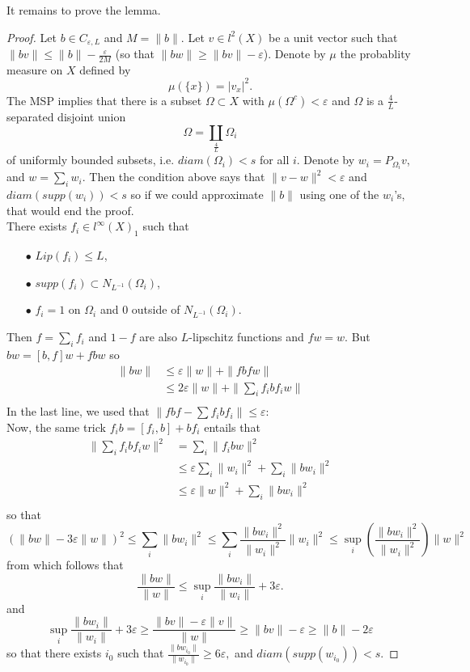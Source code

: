 It remains to prove the lemma.

\begin{proof} 
Let $b\in C_{\varepsilon,L}$ and $M=\|b\|$. Let $v\in l^2(X)$ be a unit vector such that $\|bv \|  \leq \| b \| -\frac{\varepsilon}{2M}$ (so that $\|bw\| \geq \|bv\| -\varepsilon$). Denote by $\mu$ the probablity measure on $X$ defined by 
\[\mu(\{x\} ) = |v_x|^2 .\]
The MSP implies that there is a subset $\Omega \subset X$ with $\mu(\Omega^c)<\varepsilon$ and $\Omega$ is a $\frac{4}{L}$-separated disjoint union \[\Omega = \coprod_{\frac{4}{L}} \Omega_i\]
of uniformly bounded subsets, i.e. $diam(\Omega_i)<s$ for all $i$. Denote by $w_i = P_{\Omega_i}v$, and $w=\sum_i w_i$. Then the condition above says that $\|v-w \|^2 < \varepsilon$ and $diam(supp(w_i)) <s$ so if we could approximate $\| b\| $ using one of the $w_i$'s, that would end the proof.\\

There exists $f_i\in l^\infty(X)_1$ such that 
\begin{itemize}
\item[$\bullet$] $Lip(f_i)\leq L$,
\item[$\bullet$] $supp(f_i) \subset N_{L^{-1}}(\Omega_i)$,
\item[$\bullet$] $f_i = 1$ on $\Omega_i$ and $0$ outside of $N_{L^{-1}}(\Omega_i)$.
\end{itemize}
Then $f = \sum_i f_i$ and $1-f$ are also $L$-lipschitz functions and $fw=w$. But $bw = [b,f]w +fbw$ so
\[\begin{split} 
\| bw \|     & \leq  \varepsilon \|w\| + \| f b f w\| \\
 		& \leq 2\varepsilon \|w\| + \| \sum_i f_i b f_i w\| \\
\end{split}\]
In the last line, we used that $\| fbf - \sum f_i b f_i \| \leq \varepsilon$:\\

Now, the same trick $f_i b = [f_i,b] + bf_i$ entails that 
\[\begin{split} 
 \| \sum_i f_i b f_i w\|^2   & =  \sum_i \| f_i b w\|^2 \\
 		& \leq \varepsilon \sum_i \| w_i\|^2 +\sum_i \| b w_i\|^2   \\
		& \leq \varepsilon \| w\|^2 +\sum_i \| b w_i\|^2   \\
\end{split}\]
so that 
\[ (\| bw\| -3\varepsilon \| w \|)^2 \leq \sum_i \| b w_i\|^2 \leq \sum_i \frac{\| b w_i\|^2}{\| w_i\|^2}\|w_i \|^2 \leq \sup_i (\frac{\| b w_i\|^2}{\| w_i\|^2} )\|w\|^2 \]
from which follows that
\[\frac{\| bw\|}{\|w\| } \leq \sup_i\frac{\| b w_i\|}{\| w_i\|}+3\varepsilon.\]
and
\[ \sup_i\frac{\| b w_i\|}{\| w_i\|}+3\varepsilon \geq \frac{\|bv\| -\varepsilon \|v\| }{\|w\|}\geq \|bv\| -\varepsilon \geq \|b\| -2\varepsilon \]
so that there exists $i_0$ such that $\frac{\| bw_{i_0} \| }{\| w_{i_0} \| }\geq 6 \varepsilon,$ and $diam(supp(w_{i_0})) <s$. 
\end{proof}


